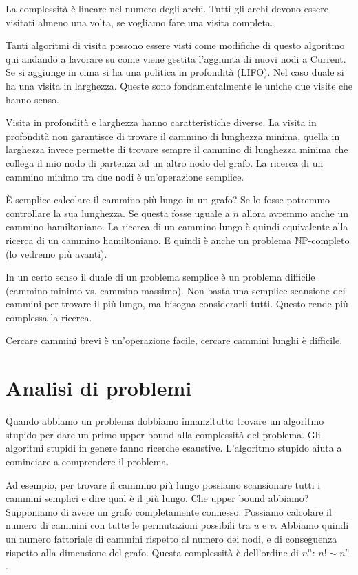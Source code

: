 La complessità è lineare nel numero degli archi. Tutti gli archi devono essere visitati almeno una
volta, se vogliamo fare una visita completa.

Tanti algoritmi di visita possono essere visti come modifiche di questo algoritmo qui andando a
lavorare su come viene gestita l'aggiunta di nuovi nodi a Current. Se si aggiunge in cima
si ha una politica in profondità (LIFO). Nel caso duale si ha una visita in larghezza. Queste sono
fondamentalmente le uniche due visite che hanno senso.

Visita in profondità e larghezza hanno caratteristiche diverse. La visita in profondità non
garantisce di trovare il cammino di lunghezza minima, quella in larghezza invece permette di trovare
sempre il cammino di lunghezza minima che collega il mio nodo di partenza ad un altro nodo del
grafo. La ricerca di un cammino minimo tra due nodi è un'operazione semplice.

È semplice calcolare il cammino più lungo in un grafo? Se lo fosse potremmo controllare la sua
lunghezza. Se questa fosse uguale a $n$ allora avremmo anche un cammino hamiltoniano. La ricerca di
un cammino lungo è quindi equivalente alla ricerca di un cammino hamiltoniano. E quindi è anche un
problema $\mathbb{NP}$-completo (lo vedremo più avanti).

In un certo senso il duale di un problema semplice è un problema difficile (cammino minimo vs.
cammino massimo). Non basta una semplice scansione dei cammini per trovare il più lungo, ma bisogna
considerarli tutti. Questo rende più complessa la ricerca.

Cercare cammini brevi è un'operazione facile, cercare cammini lunghi è difficile.

\section{Analisi di problemi}

Quando abbiamo un problema dobbiamo innanzitutto trovare un algoritmo stupido per dare un primo
upper bound alla complessità del problema. Gli algoritmi stupidi in genere fanno ricerche
esaustive. L'algoritmo stupido aiuta a cominciare a comprendere il problema.

Ad esempio, per trovare il cammino più lungo possiamo scansionare tutti i cammini semplici e dire
qual è il più lungo. Che upper bound abbiamo? Supponiamo di avere un grafo completamente connesso.
Possiamo calcolare il numero di cammini con tutte le permutazioni possibili tra $u$ e $v$. Abbiamo
quindi un numero fattoriale di cammini rispetto al numero dei nodi, e di conseguenza rispetto alla
dimensione del grafo. Questa complessità è dell'ordine di $n^{n}$: $n! \sim n^{n}$. 

